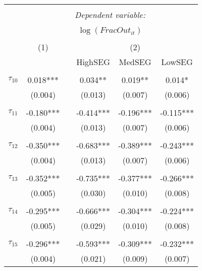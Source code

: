 \begin{tabular}{@{\extracolsep{-0pt}}lccccc} 
\\[-1.8ex]\hline 
\hline \\[-1.8ex] 
 & \multicolumn{5}{c}{\textit{Dependent variable:}} \\ 
\cline{2-6} 
\\[-1.8ex] & \multicolumn{5}{c}{$\log(FracOut_{it})$}\\ 
\\[-1.8ex] & (1) && \multicolumn{3}{c}{(2)} \\ 
\cline{2-2}\cline{4-6}
        &&& HighSEG & MedSEG & LowSEG  \\
 \\[-1.8ex] 
$\tau_{10}$     & 0.018***  &&  0.034**  &  0.019**  &   0.014*  \\
                &  (0.004)  &&  (0.013)  &  (0.007)  &  (0.006)  \\
                &           &&           &           &           \\[-2.1ex]
$\tau_{11}$     & -0.180*** && -0.414*** & -0.196*** & -0.115*** \\
                &  (0.004)  &&  (0.013)  &  (0.007)  &  (0.006)  \\
                &           &&           &           &           \\[-2.1ex]
$\tau_{12}$     & -0.350*** && -0.683*** & -0.389*** & -0.243*** \\
                &  (0.004)  &&  (0.013)  &  (0.007)  &  (0.006)  \\
                &           &&           &           &           \\[-2.1ex]
$\tau_{13}$     & -0.352*** && -0.735*** & -0.377*** & -0.266*** \\
                &  (0.005)  &&  (0.030)  &  (0.010)  &  (0.008)  \\
                &           &&           &           &           \\[-2.1ex]
$\tau_{14}$     & -0.295*** && -0.666*** & -0.304*** & -0.224*** \\
                &  (0.005)  &&  (0.029)  &  (0.010)  &  (0.008)  \\
                &           &&           &           &           \\[-2.1ex]
$\tau_{15}$     & -0.296*** && -0.593*** & -0.309*** & -0.232*** \\
                &  (0.004)  &&  (0.021)  &  (0.009)  &  (0.007)  \\

\end{tabular}
